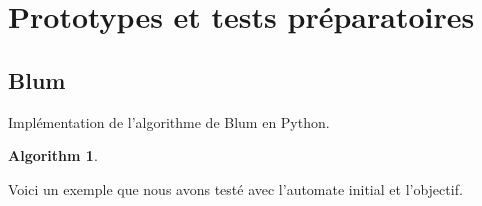 \documentclass{article}%
\newtheorem{algorithm}[theorem]{Algorithm}
\begin{document}
\section{Prototypes et tests préparatoires}

\subsection{Blum}

Implémentation de l'algorithme de Blum en Python.

\begin{algorithm}
\end{algorithm}


Voici un exemple que nous avons testé avec l'automate initial et l'objectif.
\end{document}

